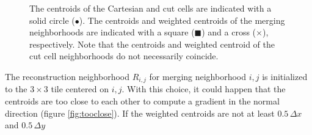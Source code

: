 \begin{enumerate}
\begin{figure}
    \centering
     \hfill
    \caption{\sf The centroids of the Cartesian and cut cells are indicated with a solid circle ($\bullet$).  The centroids and weighted centroids of the merging neighborhoods are indicated with a square ($\blacksquare$) and a cross ($\times$), respectively. Note that the centroids and weighted centroid of the cut cell neighborhoods do not necessarily coincide.}
    \label{fig:centroids}
\end{figure}
The reconstruction neighborhood $R_{i,j}$ for merging neighborhood $i,j$ is initialized to the $3 \times 3$ tile centered on $i,j$.
With this choice, it could happen that the centroids are too close to each 
other to compute a gradient in the normal direction (figure \ref{fig:tooclose}). 
If the weighted centroids are not at least $0.5\,\Delta x$  and $0.5\,\Delta y$ 

\end{enumerate}
